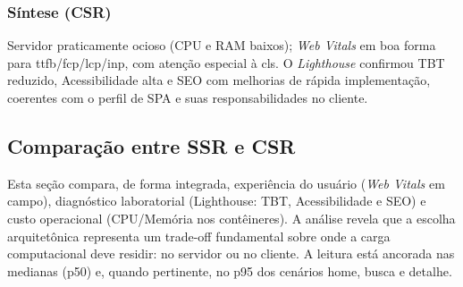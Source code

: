 \subsubsection{Síntese (CSR)}
Servidor praticamente ocioso (CPU e RAM baixos); \emph{Web Vitals} em boa forma para \acrshort{ttfb}/\acrshort{fcp}/\acrshort{lcp}/\acrshort{inp}, com atenção especial à \acrshort{cls}. O \emph{Lighthouse} confirmou TBT reduzido, Acessibilidade alta e SEO com melhorias de rápida implementação, coerentes com o perfil de SPA e suas responsabilidades no cliente.

\subsection{Comparação entre SSR e CSR}
\label{subsec:comparacao-ssr-csr}

Esta seção compara, de forma integrada, experiência do usuário (\emph{Web Vitals} em campo), diagnóstico laboratorial (Lighthouse: TBT, Acessibilidade e SEO) e custo operacional (CPU/Memória nos contêineres). A análise revela que a escolha arquitetônica representa um trade-off fundamental sobre onde a carga computacional deve residir: no servidor ou no cliente. A leitura está ancorada nas medianas (p50) e, quando pertinente, no p95 dos cenários home, busca e detalhe.

